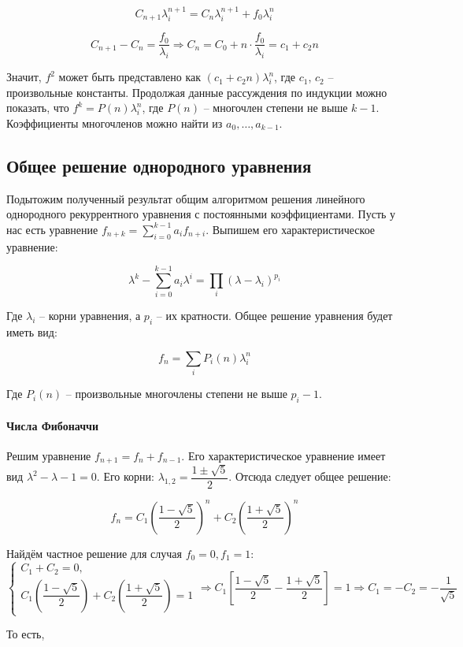 \documentclass{article}
\begin{document}
$$C_{n+1}\lambda_i^{n+1}=C_n\lambda_i^{n+1}+f_0 \lambda_i^n$$

$$C_{n+1}-C_n=\dfrac{f_0}{\lambda_i} \Longrightarrow C_n = C_0 + n \cdot \dfrac{f_0}{\lambda_i}=c_1+c_2 n$$

Значит, $f^2$ может быть представлено как $(c_1+c_2n)\lambda_i^n$, где $c_1$, $c_2$ -- произвольные константы. Продолжая данные рассуждения по индукции можно показать, что $f^k=P(n) \lambda_i^n$, где $P(n)$ -- многочлен степени не выше $k-1$. Коэффициенты многочленов можно найти из $a_0,\dots,a_{k-1}$. 

\subsection*{Общее решение однородного уравнения}

Подытожим полученный результат общим алгоритмом решения линейного однородного рекуррентного уравнения с постоянными коэффициентами. Пусть у нас есть уравнение $f_{n+k} = \sum\limits_{i=0}^{k-1}a_i f_{n+i}$. Выпишем его характеристическое уравнение:

$$\lambda^k-\sum\limits_{i=0}^{k-1} a_i\lambda^i=\prod\limits_i (\lambda - \lambda_i)^{p_i}$$

Где $\lambda_i$ -- корни уравнения, а $p_i$ -- их кратности. Общее решение уравнения будет иметь вид:

$$f_n=\sum\limits_i P_i(n)\lambda_i^n$$

Где $P_i(n)$ -- произвольные многочлены степени не выше $p_i-1$.
\paragraph{Числа Фибоначчи} Решим уравнение $f_{n+1} = f_n+f_{n-1}$. Его характеристическое уравнение имеет вид $\lambda^2-\lambda-1=0$. Его корни: $\lambda_{1,2}=\dfrac{1\pm\sqrt{5}}{2}$. Отсюда следует общее решение:

$$f_n = C_1 \left(\dfrac{1-\sqrt 5}{2}\right)^n+C_2 \left(\dfrac{1+\sqrt 5}{2}\right)^n$$

Найдём частное решение для случая $f_0=0, f_1=1$:
$$\begin{cases}
C_1+C_2=0,\\
C_1\left(\dfrac{1-\sqrt 5}{2}\right)+C_2\left(\dfrac{1+\sqrt 5}{2}\right)=1
\end{cases} \Longrightarrow C_1\left[\dfrac{1-\sqrt 5}{2}-\dfrac{1+\sqrt 5}{2}\right]=1\Longrightarrow C_1 =-C_2= -\dfrac{1}{\sqrt 5}$$

То есть, 
\end{document}

